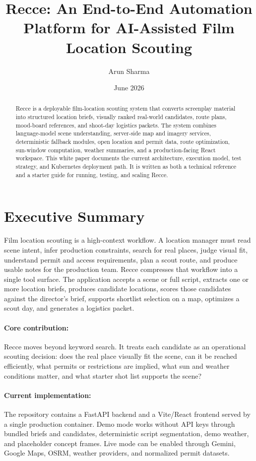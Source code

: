 \documentclass[11pt]{article}
\title{\textbf{Recce: An End-to-End Automation Platform for AI-Assisted Film Location Scouting}}
\author{Arun Sharma}
\date{June 2026}
\begin{document}
\maketitle

\begin{abstract}
Recce is a deployable film-location scouting system that converts screenplay
material into structured location briefs, visually ranked real-world candidates,
route plans, mood-board references, and shoot-day logistics packets. The system
combines language-model scene understanding, server-side map and imagery
services, deterministic fallback modules, open location and permit data, route
optimization, sun-window computation, weather summaries, and a production-facing
React workspace. This white paper documents the current architecture, execution
model, test strategy, and Kubernetes deployment path. It is written as both a
technical reference and a starter guide for running, testing, and scaling Recce.
\end{abstract}

\section{Executive Summary}

Film location scouting is a high-context workflow. A location manager must read
scene intent, infer production constraints, search for real places, judge visual
fit, understand permit and access requirements, plan a scout route, and produce
usable notes for the production team. Recce compresses that workflow into a
single tool surface. The application accepts a scene or full script, extracts
one or more location briefs, produces candidate locations, scores those
candidates against the director's brief, supports shortlist selection on a map,
optimizes a scout day, and generates a logistics packet.

\paragraph{Core contribution:}
Recce moves beyond keyword search. It treats each candidate as an operational
scouting decision: does the real place visually fit the scene, can it be reached
efficiently, what permits or restrictions are implied, what sun and weather
conditions matter, and what starter shot list supports the scene?

\paragraph{Current implementation:}
The repository contains a FastAPI backend and a Vite/React frontend served by a
single production container. Demo mode works without API keys through bundled
briefs and candidates, deterministic script segmentation, demo weather, and
placeholder concept frames. Live mode can be enabled through Gemini, Google
Maps, OSRM, weather providers, and normalized permit datasets.
\end{document}
